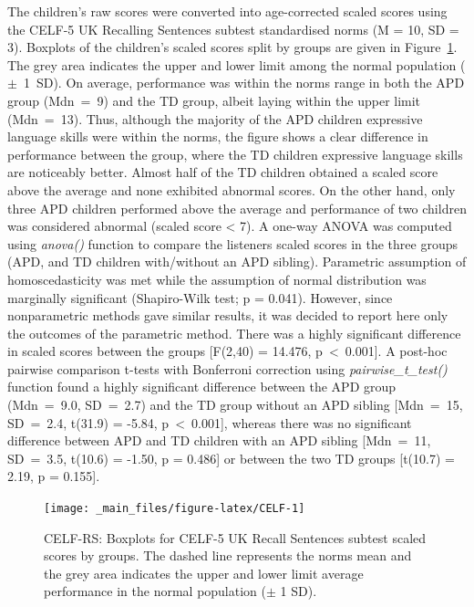 \documentclass[a4paper, twoside]{templates/ociamthesis}
\begin{document}
The children's raw scores were converted into age-corrected scaled scores using the CELF-5 UK Recalling Sentences subtest standardised norms (M = 10, SD = 3). Boxplots of the children's scaled scores split by groups are given in Figure~\ref{fig:CELF}. The grey area indicates the upper and lower limit among the normal population (\(\pm\)~1~SD). On average, performance was within the norms range in both the APD group (Mdn~=~9) and the TD group, albeit laying within the upper limit (Mdn~=~13). Thus, although the majority of the APD children expressive language skills were within the norms, the figure shows a clear difference in performance between the group, where the TD children expressive language skills are noticeably better. Almost half of the TD children obtained a scaled score above the average and none exhibited abnormal scores. On the other hand, only three APD children performed above the average and performance of two children was considered abnormal (scaled score \textless{} 7). A one-way ANOVA was computed using \emph{anova()} function to compare the listeners scaled scores in the three groups (APD, and TD children with/without an APD sibling). Parametric assumption of homoscedasticity was met while the assumption of normal distribution was marginally significant (Shapiro-Wilk test; p = 0.041). However, since nonparametric methods gave similar results, it was decided to report here only the outcomes of the parametric method. There was a highly significant difference in scaled scores between the groups {[}F(2,40) = 14.476, p~\textless~0.001{]}. A post-hoc pairwise comparison t-tests with Bonferroni correction using \emph{pairwise\_t\_test()} function \autocite[rstatix package;][]{rstatixPackageR} found a highly significant difference between the APD group (Mdn~=~9.0, SD~=~2.7) and the TD group without an APD sibling {[}Mdn~=~15, SD~=~2.4, t(31.9) = -5.84, p~\textless~0.001{]}, whereas there was no significant difference between APD and TD children with an APD sibling {[}Mdn~=~11, SD~=~3.5, t(10.6) = -1.50, p = 0.486{]} or between the two TD groups {[}t(10.7) = 2.19, p = 0.155{]}.\\

\begin{figure}

{\centering \texttt{[image: \_main\_files/figure-latex/CELF-1]} 

}

\caption{CELF-RS: Boxplots for CELF-5 UK Recall Sentences subtest scaled scores by groups. The dashed line represents the norms mean and the grey area indicates the upper and lower limit average performance in the normal population ($\pm$ 1 SD).}\label{fig:CELF}
\end{figure}
\end{document}
